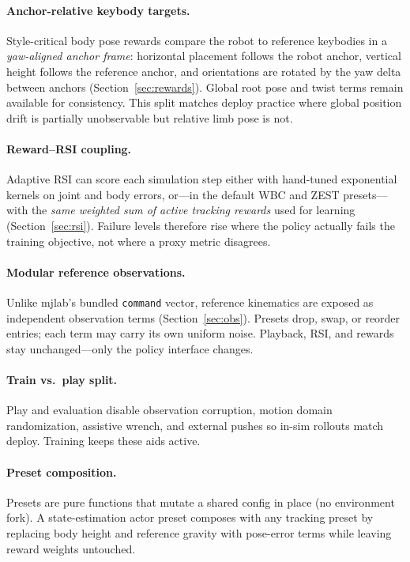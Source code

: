 \documentclass[11pt,a4paper]{article}
\begin{document}
\paragraph{Anchor-relative keybody targets.}
Style-critical body pose rewards compare the robot to reference keybodies in a
\emph{yaw-aligned anchor frame}: horizontal placement follows the robot anchor,
vertical height follows the reference anchor, and orientations are rotated by the
yaw delta between anchors (Section~\ref{sec:rewards}). Global root pose and twist
terms remain available for consistency. This split matches deploy practice where
global position drift is partially unobservable but relative limb pose is not.

\paragraph{Reward--RSI coupling.}
Adaptive RSI can score each simulation step either with hand-tuned exponential
kernels on joint and body errors, or---in the default WBC and ZEST presets---with
the \emph{same weighted sum of active tracking rewards} used for learning
(Section~\ref{sec:rsi}). Failure levels therefore rise where the policy actually
fails the training objective, not where a proxy metric disagrees.

\paragraph{Modular reference observations.}
Unlike mjlab's bundled \texttt{command} vector, reference kinematics are exposed
as independent observation terms (Section~\ref{sec:obs}). Presets drop, swap, or
reorder entries; each term may carry its own uniform noise. Playback, RSI, and
rewards stay unchanged---only the policy interface changes.

\paragraph{Train vs.\ play split.}
Play and evaluation disable observation corruption, motion domain randomization,
assistive wrench, and external pushes so in-sim rollouts match deploy. Training
keeps these aids active.

\paragraph{Preset composition.}
Presets are pure functions that mutate a shared config in place (no environment
fork). A state-estimation actor preset composes with any tracking preset by
replacing body height and reference gravity with pose-error terms while leaving reward
weights untouched.
\end{document}
